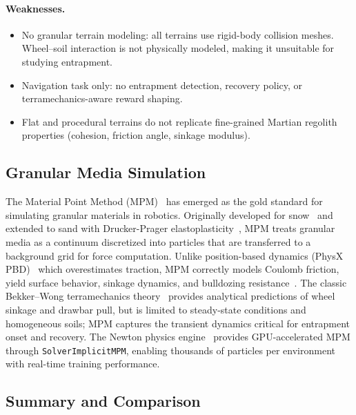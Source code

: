 \documentclass[12pt,a4paper]{article}
\begin{document}
\paragraph{Weaknesses.}
\begin{itemize}
    \item No granular terrain modeling: all terrains use rigid-body collision meshes. Wheel--soil interaction is not physically modeled, making it unsuitable for studying entrapment.
    \item Navigation task only: no entrapment detection, recovery policy, or terramechanics-aware reward shaping.
    \item Flat and procedural terrains do not replicate fine-grained Martian regolith properties (cohesion, friction angle, sinkage modulus).
\end{itemize}


\subsection{Granular Media Simulation}

The Material Point Method (MPM)~\cite{sulsky1994particle} has emerged as the gold standard for simulating granular materials in robotics. Originally developed for snow~\cite{stomakhin2013snow} and extended to sand with Drucker-Prager elastoplasticity~\cite{klar2016sand}, MPM treats granular media as a continuum discretized into particles that are transferred to a background grid for force computation. Unlike position-based dynamics (PhysX PBD)~\cite{macklin2014pbd} which overestimates traction, MPM correctly models Coulomb friction, yield surface behavior, sinkage dynamics, and bulldozing resistance~\cite{baumgarten2019granular}. The classic Bekker--Wong terramechanics theory~\cite{bekker1960} provides analytical predictions of wheel sinkage and drawbar pull, but is limited to steady-state conditions and homogeneous soils; MPM captures the transient dynamics critical for entrapment onset and recovery. The Newton physics engine~\cite{newton} provides GPU-accelerated MPM through \texttt{SolverImplicitMPM}, enabling thousands of particles per environment with real-time training performance.


\newpage
\subsection{Summary and Comparison}
\end{document}
